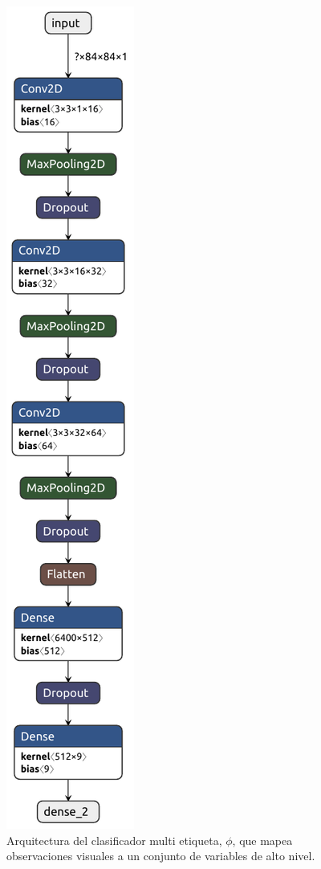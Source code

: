 \begin{figure}[h]
    \includegraphics[scale=0.6]{Chapter5/Figs/multilabel_classifier.pdf}
    \caption{Arquitectura del clasificador multi etiqueta, $\phi$, que
    mapea observaciones visuales a un conjunto de variables
    de alto nivel.}
    \label{fig:cnn-classifier}
\end{figure}


